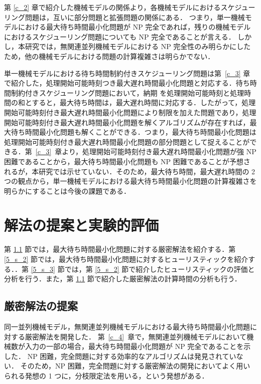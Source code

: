 \documentclass[12pt]{optlab-bachelor}
\begin{document}
第 \ref{c_2} 章で紹介した機械モデルの関係より，各機械モデルにおけるスケジューリング問題は，互いに部分問題と拡張問題の関係にある．
つまり，単一機械モデルにおける最大待ち時間最小化問題が NP 完全であれば，残りの機械モデルにおけるスケジューリング問題についても NP 完全であることが言える．
しかし，本研究では，無関連並列機械モデルにおける NP 完全性のみ明らかにしたため，他の機械モデルにおける問題の計算複雑さは明らかでない．

単一機械モデルにおける待ち時間制約付きスケジューリング問題は第~\ref{c_3} 章で紹介した，処理開始可能時刻つき最大遅れ時間最小化問題と対応する．待ち時間制約付きスケジューリング問題において，納期 を処理開始可能時刻と処理時間の和とすると，最大待ち時間は，最大遅れ時間に対応する．したがって，処理開始可能時刻付き最大遅れ時間最小化問題により制限を加えた問題であり，処理開始可能時刻付き最大遅れ時間最小化問題を解くアルゴリズムが存在すれば，最大待ち時間最小化問題も解くことができる．つまり，最大待ち時間最小化問題は処理開始可能時刻付き最大遅れ時間最小化問題の部分問題として捉えることができる．第~\ref{c_3}~章より，処理開始可能時刻付き最大遅れ時間最小化問題が強 NP 困難であることから，最大待ち時間最小化問題も NP 困難であることが予想されるが，本研究では示せていない．そのため，最大待ち時間，最大遅れ時間の 2 つの観点から，単一機械モデルにおける最大待ち時間最小化問題の計算複雑さを明らかにすることは今後の課題である．


\chapter{解法の提案と実験的評価}\label{c_5}
第 \ref{5_s_1} 節では，最大待ち時間最小化問題に対する厳密解法を紹介する．第 \ref{5_s_2} 節では，最大待ち時間最小化問題に対するヒューリスティックを紹介する．．第 \ref{5_s_3} 節では，第 \ref{5_s_2} 節で紹介したヒューリスティックの評価と分析を行う．また，第 \ref{5_s_1} 節で紹介した厳密解法の計算時間の分析も行う．

\section{厳密解法の提案}\label{5_s_1}
同一並列機械モデル，無関連並列機械モデルにおける最大待ち時間最小化問題に対する厳密解法を開発した．
第~\ref{c_4}~章で，無関連並列機械モデルにおいて機械数が入力の一部の場合，最大待ち時間最小化問題が NP 完全であることを示した．
NP 困難，完全問題に対する効率的なアルゴリズムは発見されていない．
そのため，NP 困難，完全問題に対する厳密解法の開発においてよく用いられる発想の 1 つに，分枝限定法を用いる，という発想がある．
\end{document}
